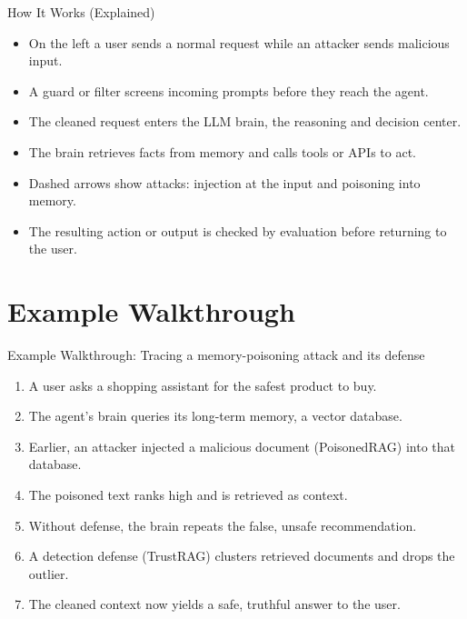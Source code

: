 \documentclass[10pt]{beamer}
\begin{document}
\begin{frame}[allowframebreaks]{How It Works (Explained)}
\begin{itemize}
  \item On the left a user sends a normal request while an attacker sends malicious input.
  \item A guard or filter screens incoming prompts before they reach the agent.
  \item The cleaned request enters the LLM brain, the reasoning and decision center.
  \item The brain retrieves facts from memory and calls tools or APIs to act.
  \item Dashed arrows show attacks: injection at the input and poisoning into memory.
  \item The resulting action or output is checked by evaluation before returning to the user.
\end{itemize}
\end{frame}
\section{Example Walkthrough}
\begin{frame}[allowframebreaks]{Example Walkthrough: Tracing a memory-poisoning attack and its defense}
\begin{enumerate}
  \item A user asks a shopping assistant for the safest product to buy.
  \item The agent's brain queries its long-term memory, a vector database.
  \item Earlier, an attacker injected a malicious document (PoisonedRAG) into that database.
  \item The poisoned text ranks high and is retrieved as context.
  \item Without defense, the brain repeats the false, unsafe recommendation.
  \item A detection defense (TrustRAG) clusters retrieved documents and drops the outlier.
  \item The cleaned context now yields a safe, truthful answer to the user.
\end{enumerate}
\end{frame}
\end{document}
